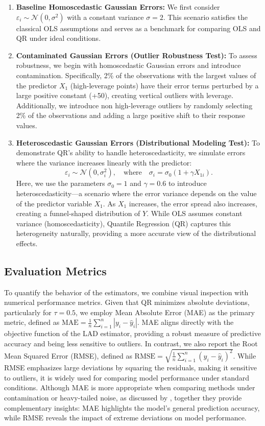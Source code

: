 \documentclass[fleqn,10pt]{latex/stylish_article} %
\begin{document}
\begin{enumerate}
\def\labelenumi{\arabic{enumi}.}
\item
  \textbf{Baseline Homoscedastic Gaussian Errors:} We first consider \(\varepsilon_i \sim \mathcal{N}(0, \sigma^2)\) with a constant variance \(\sigma = 2\). This scenario satisfies the classical OLS assumptions and serves as a benchmark for comparing OLS and QR under ideal conditions.
\item
  \textbf{Contaminated Gaussian Errors (Outlier Robustness Test):} To assess robustness, we begin with homoscedastic Gaussian errors and introduce contamination. Specifically, 2\% of the observations with the largest values of the predictor \(X_1\) (high-leverage points) have their error terms perturbed by a large positive constant (+50), creating vertical outliers with leverage. Additionally, we introduce non high-leverage outliers by randomly selecting 2\% of the observations and adding a large positive shift to their response values.
\item
  \textbf{Heteroscedastic Gaussian Errors (Distributional Modeling Test):}
  To demonstrate QR's ability to handle heteroscedasticity, we simulate errors where the variance increases linearly with the predictor:
  \[
  \varepsilon_i \sim \mathcal{N}(0, \sigma^2_i), \quad \text{where} \quad \sigma_i = \sigma_0 (1 + \gamma X_{1i}).
  \]
  Here, we use the parameters \(\sigma_0 = 1\) and \(\gamma = 0.6\) to introduce heteroscedasticity---a scenario where the error variance depends on the value of the predictor variable \(X_1\). As \(X_1\) increases, the error spread also increases, creating a funnel-shaped distribution of \(Y\). While OLS assumes constant variance (homoscedasticity), Quantile Regression (QR) captures this heterogeneity naturally, providing a more accurate view of the distributional effects.
\end{enumerate}

\subsection{Evaluation Metrics}\label{evaluation-metrics}

To quantify the behavior of the estimators, we combine visual inspection with numerical performance metrics. Given that QR minimizes absolute deviations, particularly for \(\tau = 0.5\), we employ Mean Absolute Error (MAE) as the primary metric, defined as \(\text{MAE} = \frac{1}{n} \sum_{i=1}^n |y_i - \hat{y}_i|\). MAE aligns directly with the objective function of the LAD estimator, providing a robust measure of predictive accuracy and being less sensitive to outliers. In contrast, we also report the Root Mean Squared Error (RMSE), defined as \(\text{RMSE} = \sqrt{\frac{1}{n} \sum_{i=1}^n (y_i - \hat{y}_i)^2}\). While RMSE emphasizes large deviations by squaring the residuals, making it sensitive to outliers, it is widely used for comparing model performance under standard conditions. Although MAE is more appropriate when comparing methods under contamination or heavy-tailed noise, as discussed by \citet{Koenker2005}, together they provide complementary insights: MAE highlights the model's general prediction accuracy, while RMSE reveals the impact of extreme deviations on model performance.
\end{document}
